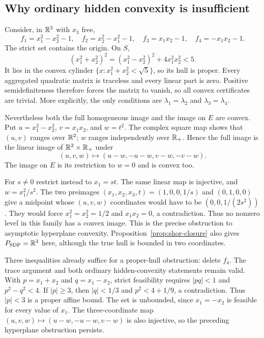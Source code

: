 \subsection{Why ordinary hidden convexity is insufficient}

\begin{example}\label{ex:ordinary-hc}
Consider, in $\mathbb R^3$ with $x_3$ free,
\begin{equation}\label{eq:ordinary-hc-example}
 f_1=x_1^2-x_2^2-1,\quad f_2=x_2^2-x_1^2-1,\quad
 f_3=x_1x_2-1,\quad f_4=-x_1x_2-1.
\end{equation}
The strict set contains the origin. On $S$,
\[
 (x_1^2+x_2^2)^2=(x_1^2-x_2^2)^2+4x_1^2x_2^2<5.
\]
It lies in the convex cylinder
$\{x:x_1^2+x_2^2<\sqrt5\}$, so its hull is proper.
Every aggregated quadratic matrix is traceless and every linear
part is zero. Positive semidefiniteness therefore forces the matrix
to vanish, so all convex certificates are trivial. More explicitly,
the only conditions are $\lambda_1=\lambda_2$ and
$\lambda_3=\lambda_4$.

Nevertheless both the full homogeneous image and the image on $E$
are convex. Put $u=x_1^2-x_2^2$, $v=x_1x_2$, and $w=t^2$.
The complex square map shows that $(u,v)$ ranges over $\mathbb R^2$;
$w$ ranges independently over $\mathbb R_+$. Hence the full image is
the linear image of $\mathbb R^2\times\mathbb R_+$ under
\[
 (u,v,w)\longmapsto(u-w,-u-w,v-w,-v-w).
\]
The image on $E$ is its restriction to $w=0$ and is convex too.

For $s\ne0$ restrict instead to $x_1=st$. The same linear map is
injective, and $w=x_1^2/s^2$. The two preimages
$(x_1,x_2,x_3,t)=(1,0,0,1/s)$ and $(0,1,0,0)$ give a midpoint
whose $(u,v,w)$ coordinates would have to be
$(0,0,1/(2s^2))$. They would force
$x_1^2=x_2^2=1/2$ and $x_1x_2=0$, a contradiction.
Thus no nonzero level in this family has a convex image. This is
the precise obstruction to asymptotic hyperplane convexity.
Proposition~\ref{prop:shor-closure} also gives $P_{\rm SDP}=\mathbb R^3$ here,
although the true hull is bounded in two coordinates.

Three inequalities already suffice for a proper-hull obstruction:
delete $f_4$. The trace argument and both ordinary hidden-convexity
statements remain valid. With $p=x_1+x_2$ and $q=x_1-x_2$, strict
feasibility requires $|pq|<1$ and $p^2-q^2<4$.
If $|p|\geq3$, then $|q|<1/3$ and
$p^2<4+1/9$, a contradiction. Thus $|p|<3$ is a proper affine
bound. The set is unbounded, since $x_1=-x_2$ is feasible for every
value of $x_1$. The three-coordinate map
$(u,v,w)\mapsto(u-w,-u-w,v-w)$ is also injective, so the preceding
hyperplane obstruction persists.
\end{example}

